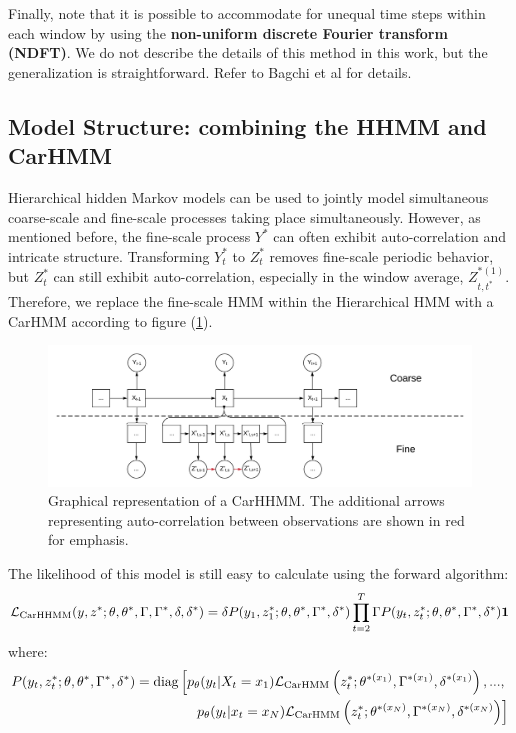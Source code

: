 Finally, note that it is possible to accommodate for unequal time steps within each window by using the \textbf{non-uniform discrete Fourier transform (NDFT)}. We do not describe the details of this method in this work, but the generalization is straightforward. Refer to Bagchi et al \cite{Bagchi:2001} for details.


\subsection{Model Structure: combining the HHMM and CarHMM}

Hierarchical hidden Markov models can be used to jointly model simultaneous coarse-scale and fine-scale processes taking place simultaneously. However, as mentioned before, the fine-scale process $Y^*$ can often exhibit auto-correlation and intricate structure. Transforming $Y^*_t$ to $Z^*_t$ removes fine-scale periodic behavior, but $Z^*_t$ can still exhibit auto-correlation, especially in the window average, $Z_{t,t^*}^{*(1)}$. Therefore, we replace the fine-scale HMM within the Hierarchical HMM with a CarHMM according to figure (\ref{fig:CarHHMM}).

\begin{figure}[h!]
	\centering
	\includegraphics[width=7.5in]{../Plots/CarHHMM.png}
	\caption{Graphical representation of a CarHHMM. The additional arrows representing auto-correlation between observations are shown in red for emphasis.}
	\label{fig:CarHHMM}
\end{figure}

The likelihood of this model is still easy to calculate using the forward algorithm:
%
$$\mathcal{L}_{\text{CarHHMM}}(y,z^*;\theta,\theta^*,\Gamma,\Gamma^*,\delta,\delta^*) = \delta P(y_1,z_1^*;\theta,\theta^*,\Gamma^*,\delta^*) \prod_{t=2}^T \Gamma P(y_t,z_t^*;\theta,\theta^*,\Gamma^*,\delta^*) \mathbf{1}$$
%
where:
%
\begin{align*}
P(y_t,z_t^*;\theta,\theta^*,\Gamma^*,\delta^*)  = \text{diag}\left[p_{\theta}(y_t|X_t = x_1)\mathcal{L}_{\text{CarHMM}}\left(z_t^*;\theta^{*(x_1)},\Gamma^{*(x_1)},\delta^{*(x_1)}\right), . . . , \right.\\
\left. p_{\theta}(y_t|x_t = x_N )\mathcal{L}_{\text{CarHMM}}\left(z_t^*;\theta^{*(x_N)},\Gamma^{*(x_N)},\delta^{*(x_N)}\right) \right]
\end{align*}
%